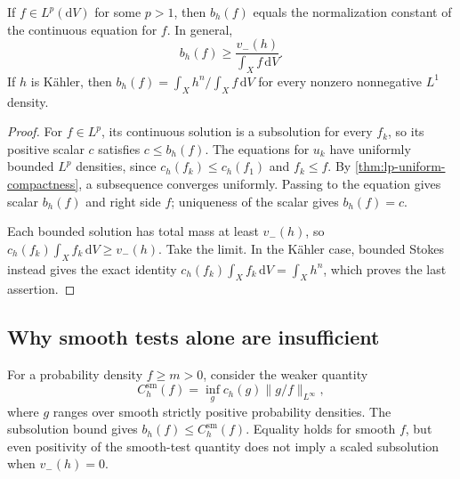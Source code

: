 \begin{proposition}\label{prop:individual-normalizer-lp}
If $f\in L^p(\mathrm{d}V)$ for some $p>1$, then $b_h(f)$ equals the normalization constant of the continuous equation for $f$. In general,
\[
 b_h(f)\geq\frac{v_-(h)}{\int_Xf\,\mathrm{d}V}.
\]
If $h$ is K\"ahler, then $b_h(f)=\int_Xh^n/\int_Xf\,\mathrm{d}V$ for every nonzero nonnegative $L^1$ density.
\end{proposition}
\begin{proof}
For $f\in L^p$, its continuous solution is a subsolution for every $f_k$, so its positive scalar $c$ satisfies $c\leq b_h(f)$. The equations for $u_k$ have uniformly bounded $L^p$ densities, since $c_h(f_k)\leq c_h(f_1)$ and $f_k\leq f$. By \cref{thm:lp-uniform-compactness}, a subsequence converges uniformly. Passing to the equation gives scalar $b_h(f)$ and right side $f$; uniqueness of the scalar gives $b_h(f)=c$.

Each bounded solution has total mass at least $v_-(h)$, so $c_h(f_k)\int_Xf_k\,\mathrm{d}V\geq v_-(h)$. Take the limit. In the K\"ahler case, bounded Stokes instead gives the exact identity $c_h(f_k)\int_Xf_k\,\mathrm{d}V=\int_Xh^n$, which proves the last assertion.
\end{proof}

\subsection{Why smooth tests alone are insufficient}

For a probability density $f\geq m>0$, consider the weaker quantity
\[
 C_h^{\mathrm{sm}}(f)=\inf_g c_h(g)\|g/f\|_{L^\infty},
\]
where $g$ ranges over smooth strictly positive probability densities. The subsolution bound gives $b_h(f)\leq C_h^{\mathrm{sm}}(f)$. Equality holds for smooth $f$, but even positivity of the smooth-test quantity does not imply a scaled subsolution when $v_-(h)=0$.

